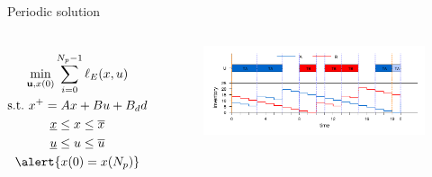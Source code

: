 \documentclass[table]{beamer}
\newcommand\bu {\mathbf{u}}
\begin{document}
\begin{frame}{Periodic solution}
\begin{columns}[T]
{\tiny{
 \begin{gather*}
\min_{\bu,x(0)} \sum_{i=0}^{N_p-1} \ell_E(x,u) \\
\text{s.t.~} x^+ = Ax + Bu + B_dd \\
\underline{x} \leq x \leq \overline{x} \\
\underline{u} \leq u \leq \overline{u} \\
\alert{x(0) = x(N_p)}
\end{gather*}}}
\begin{figure}
   \includegraphics[scale=0.45]{gantt_Periodic.pdf}
  \end{figure}
\end{columns} 
\centerline{\color{blue}{A suboptimal infinite
    horizon solution in response to nominal demands}}
 

\end{frame}
\end{document}
